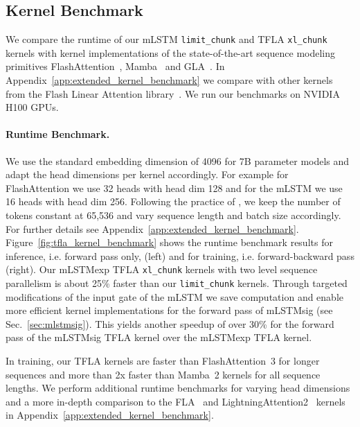 \documentclass{article}
\begin{document}
\vspace{-0.1cm}
\subsection{Kernel Benchmark}
\label{sec:kernel_benchmark}
\vspace{-0.1cm}
We compare the runtime of our mLSTM \texttt{limit\_chunk} and TFLA \texttt{xl\_chunk} kernels with kernel implementations of the state-of-the-art sequence modeling primitives FlashAttention~\citep{dao:23flashattention2, shah:24flashattention3}, Mamba~\citep{Gu:24mamba, dao:24transformersaressms} and GLA~\cite{yang:24gated}.
In Appendix~\ref{app:extended_kernel_benchmark} we compare with other kernels from the Flash Linear Attention library~\citep{yang:24fla}.
We run our benchmarks on NVIDIA H100 GPUs.
\vspace{-0.2cm}
\paragraph{Runtime Benchmark.}
We use the standard embedding dimension of 4096 for 7B parameter models and adapt the head dimensions per kernel accordingly. For example for FlashAttention we use 32 heads with head dim 128 and for the mLSTM we use 16 heads with head dim 256.
Following the practice of \citet{shah:24flashattention3}, we keep the number of tokens constant at 65,536 and vary sequence length and batch size accordingly.
For further details see Appendix~\ref{app:extended_kernel_benchmark}.
Figure~\ref{fig:tfla_kernel_benchmark} shows the runtime benchmark results for inference, i.e. forward pass only, (left) and for training, i.e. forward-backward pass (right).
Our mLSTMexp TFLA \texttt{xl\_chunk} kernels with two level sequence parallelism is about 25\% faster than our \texttt{limit\_chunk} kernels.
Through targeted modifications of the input gate of the mLSTM we save computation and enable more efficient kernel implementations for the forward pass of mLSTMsig (see Sec.~\ref{sec:mlstmsig}).
This yields another speedup of over 30\% for the forward pass of the mLSTMsig TFLA kernel over the mLSTMexp TFLA kernel.

In training, our TFLA kernels are faster than FlashAttention~3 for longer sequences and more than 2x faster than Mamba~2 kernels for all sequence lengths.
We perform additional runtime benchmarks for varying head dimensions and a more in-depth comparison to the FLA~\citep{yang:24gated} and LightningAttention2~\citep{qin:24lightningattention2} kernels in Appendix~\ref{app:extended_kernel_benchmark}.
\end{document}
